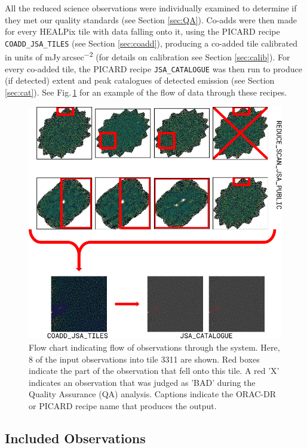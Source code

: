\documentclass[twocolumn,times]{aastex6}
\newcommand{\jyas}{Jy\,arcsec\textsuperscript{$-$2}}
\begin{document}
All the reduced science observations were individually examined to
determine if they met our quality standards (see Section
\ref{sec:QA}). Co-adds were then made for every HEALPix tile with data
falling onto it, using the PICARD recipe \texttt{COADD\_JSA\_TILES}
(see Section \ref{sec:coadd}), producing a co-added tile calibrated in
units of m\jyas{} (for details on calibration see Section
\ref{sec:calib}). For every co-added tile, the PICARD recipe
\texttt{JSA\_CATALOGUE} was then run to produce (if detected) extent
and peak catalogues of detected emission (see Section
\ref{sec:cat}). See Fig.\,\ref{fig:flowchart} for an example of
the flow of data through these recipes.

\begin{figure}
  \centering
  \includegraphics[width=1.0\linewidth]{flowchart}
  \caption{Flow chart indicating flow of observations through the
    system. Here, 8 of the input observations into tile 3311 are
    shown. Red boxes indicate the part of the observation that fell
    onto this tile. A red 'X' indicates an observation that was judged
    as 'BAD' during the Quality Assurance (QA) analysis. Captions
    indicate the ORAC-DR or PICARD recipe name that produces the output.}
  \label{fig:flowchart}
\end{figure}

\subsection{Included Observations}
\end{document}
